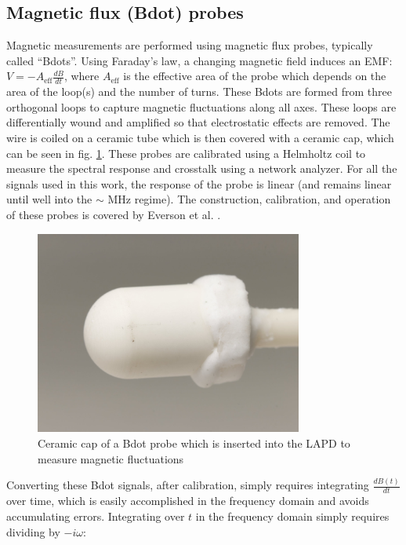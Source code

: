 \subsection{Magnetic flux (Bdot) probes}

Magnetic measurements are performed using magnetic flux probes, typically called ``Bdots''. Using Faraday's law, a changing magnetic field induces an EMF: $V = - A_\text{eff} \frac{dB}{dt}$, where $A_\text{eff}$ is the effective area of the probe which depends on the area of the loop(s) and the number of turns. These Bdots are formed from three orthogonal loops to capture magnetic fluctuations along all axes. These loops are differentially wound and amplified so that electrostatic effects are removed. The wire is coiled on a ceramic tube which is then covered with a ceramic cap, which can be seen in fig. \ref{fig:bdot-cap}. These probes are calibrated using a Helmholtz coil to measure the spectral response and crosstalk using a network analyzer. For all the signals used in this work, the response of the probe is linear (and remains linear until well into the $\sim$ MHz regime). The construction, calibration, and operation of these probes is covered by Everson et al. \cite{Everson_design_2009}.

\begin{figure}
	\centering
	\includegraphics[width=250pt]{figures/bdot_cap.jpg}
	\caption[Ceramic cap of a Bdot probe]{\label{fig:bdot-cap}Ceramic cap of a Bdot probe which is inserted into the LAPD to measure magnetic fluctuations}
\end{figure}

Converting these Bdot signals, after calibration, simply requires integrating $\frac{dB(t)}{dt}$ over time, which is easily accomplished in the frequency domain and avoids accumulating errors. Integrating over $t$ in the frequency domain simply requires dividing by $-i\omega$:

